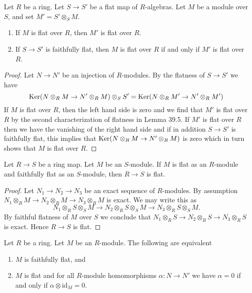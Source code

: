 \begin{lemma}
	\label{lemma-flatness-descends-more-general}
	Let $R$ be a ring. Let $S \to S'$ be a flat map of $R$-algebras.
	Let $M$ be a module over $S$, and set $M' = S' \otimes_S M$.
	\begin{enumerate}
		\item If $M$ is flat over $R$, then $M'$ is flat over $R$.
		\item If $S \to S'$ is faithfully flat, then $M$ is flat
		over $R$ if and only if $M'$ is flat over $R$.
	\end{enumerate}
\end{lemma}

\begin{proof}
	Let $N \to N'$ be an injection of $R$-modules. By the flatness
	of $S \to S'$ we have
	$$
	\mathop{\mathrm{Ker}}(N \otimes_R M \to N' \otimes_R M) \otimes_S S'
	=
	\mathop{\mathrm{Ker}}(N \otimes_R M' \to N' \otimes_R M')
	$$
	If $M$ is flat over $R$, then the left hand side is zero and
	we find that $M'$ is flat over $R$ by the second characterization
	of flatness in Lemma 39.5.
	If $M'$ is flat over $R$ then we have the vanishing of the right hand side
	and if in addition $S \to S'$ is faithfully flat, this implies that
	$\mathop{\mathrm{Ker}}(N \otimes_R M \to N' \otimes_R M)$ is zero which in turn
	shows that $M$ is flat over $R$.
\end{proof}

\begin{lemma}
	\label{lemma-flat-permanence}
	Let $R \to S$ be a ring map. Let $M$ be an $S$-module.
	If $M$ is flat as an $R$-module and faithfully flat as an $S$-module,
	then $R \to S$ is flat.
\end{lemma}

\begin{proof}
	Let $N_1 \to N_2 \to N_3$ be an exact sequence of $R$-modules.
	By assumption $N_1 \otimes_R M \to N_2 \otimes_R M \to N_3 \otimes_R M$
	is exact. We may write this as
	$$
	N_1 \otimes_R S \otimes_S M
	\to
	N_2 \otimes_R S \otimes_S M
	\to
	N_3 \otimes_R S \otimes_S M.
	$$
	By faithful flatness of $M$ over $S$ we conclude that
	$N_1 \otimes_R S \to N_2 \otimes_R S \to N_3 \otimes_R S$ is exact.
	Hence $R \to S$ is flat.
\end{proof}

\begin{lemma}
	\label{lemma-easy-ff}
	Let $R$ be a ring.
	Let $M$ be an $R$-module.
	The following are equivalent
	\begin{enumerate}
		\item $M$ is faithfully flat, and
		\item $M$ is flat and for all $R$-module homomorphisms $\alpha : N \to N'$
		we have $\alpha = 0$ if and only if $\alpha \otimes \text{id}_M = 0$.
	\end{enumerate}
\end{lemma}

